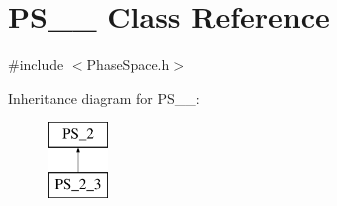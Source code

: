 \hypertarget{classPS__2__3}{\section{P\-S\-\_\-\_ Class Reference}
\label{classPS__2__3}
}


{\ttfamily \#include $<$Phase\-Space.\-h$>$}

Inheritance diagram for P\-S\-\_\-\_\-:\begin{figure}[H]
\begin{center}
\leavevmode
\includegraphics[height=2.000000cm]{classPS__2__3}
\end{center}
\end{figure}
